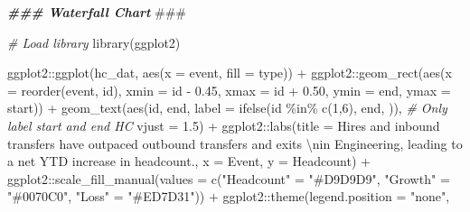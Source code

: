 \documentclass[
]{book}
\newenvironment{Shaded}{\begin{snugshade}}{\end{snugshade}}
\newcommand{\AlertTok}[1]{\textcolor[rgb]{0.94,0.16,0.16}{#1}}
\newcommand{\AttributeTok}[1]{\textcolor[rgb]{0.77,0.63,0.00}{#1}}
\newcommand{\CommentTok}[1]{\textcolor[rgb]{0.56,0.35,0.01}{\textit{#1}}}
\newcommand{\DecValTok}[1]{\textcolor[rgb]{0.00,0.00,0.81}{#1}}
\newcommand{\DocumentationTok}[1]{\textcolor[rgb]{0.56,0.35,0.01}{\textbf{\textit{#1}}}}
\newcommand{\FloatTok}[1]{\textcolor[rgb]{0.00,0.00,0.81}{#1}}
\newcommand{\FunctionTok}[1]{\textcolor[rgb]{0.00,0.00,0.00}{#1}}
\newcommand{\NormalTok}[1]{#1}
\newcommand{\OtherTok}[1]{\textcolor[rgb]{0.56,0.35,0.01}{#1}}
\newcommand{\SpecialCharTok}[1]{\textcolor[rgb]{0.00,0.00,0.00}{#1}}
\newcommand{\StringTok}[1]{\textcolor[rgb]{0.31,0.60,0.02}{#1}}
\begin{document}
\begin{Shaded}
\begin{Highlighting}[]
\DocumentationTok{\#\#\# Waterfall Chart }\AlertTok{\#\#\#}

\CommentTok{\# Load library}
\FunctionTok{library}\NormalTok{(ggplot2)}

\NormalTok{ggplot2}\SpecialCharTok{::}\FunctionTok{ggplot}\NormalTok{(hc\_dat, }\FunctionTok{aes}\NormalTok{(}\AttributeTok{x =}\NormalTok{ event, }\AttributeTok{fill =}\NormalTok{ type)) }\SpecialCharTok{+}
\NormalTok{ggplot2}\SpecialCharTok{::}\FunctionTok{geom\_rect}\NormalTok{(}\FunctionTok{aes}\NormalTok{(}\AttributeTok{x =} \FunctionTok{reorder}\NormalTok{(event, id),}
                       \AttributeTok{xmin =}\NormalTok{ id }\SpecialCharTok{{-}} \FloatTok{0.45}\NormalTok{,}
                       \AttributeTok{xmax =}\NormalTok{ id }\SpecialCharTok{+} \FloatTok{0.50}\NormalTok{,}
                       \AttributeTok{ymin =}\NormalTok{ end,}
                       \AttributeTok{ymax =}\NormalTok{ start)) }\SpecialCharTok{+}
\FunctionTok{geom\_text}\NormalTok{(}\FunctionTok{aes}\NormalTok{(id, end, }\AttributeTok{label =} \FunctionTok{ifelse}\NormalTok{(id }\SpecialCharTok{\%in\%} \FunctionTok{c}\NormalTok{(}\DecValTok{1}\NormalTok{,}\DecValTok{6}\NormalTok{), end, }\StringTok{\textquotesingle{}\textquotesingle{}}\NormalTok{)), }\CommentTok{\# Only label start and end HC}
              \AttributeTok{vjust =} \FloatTok{1.5}\NormalTok{) }\SpecialCharTok{+}
\NormalTok{ggplot2}\SpecialCharTok{::}\FunctionTok{labs}\NormalTok{(}\AttributeTok{title =} \StringTok{\textquotesingle{}Hires and inbound transfers have outpaced outbound transfers and exits }\SpecialCharTok{\textbackslash{}n}\StringTok{in Engineering, leading to a net YTD increase in headcount.\textquotesingle{}}\NormalTok{,}
              \AttributeTok{x =} \StringTok{\textquotesingle{}Event\textquotesingle{}}\NormalTok{,}
              \AttributeTok{y =} \StringTok{\textquotesingle{}Headcount\textquotesingle{}}\NormalTok{) }\SpecialCharTok{+}
\NormalTok{ggplot2}\SpecialCharTok{::}\FunctionTok{scale\_fill\_manual}\NormalTok{(}\AttributeTok{values =} \FunctionTok{c}\NormalTok{(}\StringTok{"Headcount"} \OtherTok{=} \StringTok{"\#D9D9D9"}\NormalTok{,}
                                      \StringTok{"Growth"} \OtherTok{=} \StringTok{"\#0070C0"}\NormalTok{,}
                                      \StringTok{"Loss"} \OtherTok{=} \StringTok{"\#ED7D31"}\NormalTok{)) }\SpecialCharTok{+}
\NormalTok{ggplot2}\SpecialCharTok{::}\FunctionTok{theme}\NormalTok{(}\AttributeTok{legend.position =} \StringTok{"none"}\NormalTok{,}

\end{Highlighting}
\end{Shaded}
\end{document}
